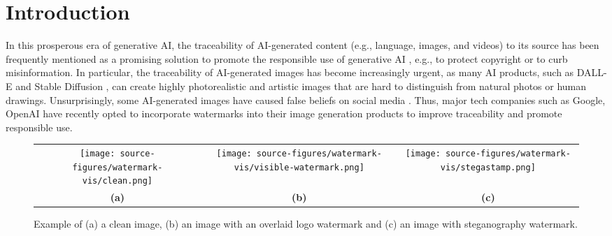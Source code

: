 \section{Introduction}
\label{Sec: Intro}
In this prosperous era of generative AI, the traceability of AI-generated content (e.g., language, images, and videos) to its source has been frequently mentioned as a promising solution to promote the responsible use of generative AI \citep{fan2023trustworthiness}, e.g., to protect copyright or to curb misinformation. In particular, the traceability of AI-generated images has become increasingly urgent, as many AI products, such as DALL-E \citep{ramesh2022hierarchical} and Stable Diffusion \citep{rombach2022high}, can create highly photorealistic and artistic images that are hard to distinguish from natural photos or human drawings. Unsurprisingly, some AI-generated images have caused false beliefs on social media \citep{bbc2024ai}. Thus, major tech companies such as Google, OpenAI \citep{rueters2023openai} have recently opted to incorporate watermarks into their image generation products to improve traceability and promote responsible use. 


\begin{figure*}[!htbp]
\centering
\begin{tabular}{ccc}
\texttt{[image: source-figures/watermark-vis/clean.png]}
&\texttt{[image: source-figures/watermark-vis/visible-watermark.png]}
&\texttt{[image: source-figures/watermark-vis/stegastamp.png]}\\
\small{\textbf{(a)}}%
&\small{\textbf{(b)}}%
&\small{\textbf{(c)}}%
\end{tabular}
\caption{Example of (a) a clean image, (b) an image with an overlaid logo watermark and (c) an image with steganography watermark.}%
\vspace{-0.5em}
\label{Fig: watermark vis intro}
\end{figure*}
